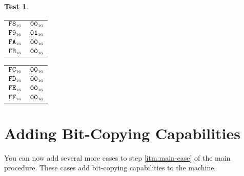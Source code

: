 \documentclass[a4paper,12pt]{article}
\makeatletter
\newcommand{\num}[1]{\texttt{#1}}
\newcommand{\hex}[1]{\num{#1}_{\textup{\tiny 16}}}
\newcommand{\MEM}[1]{\ifthenelse{\equal{#1}{}}{M}{M[#1]}}
\theoremstyle{definition}
\newtheorem{test}{Test}
\newenvironment{memtable}{%
  \begin{trivlist}
    \item
    }{%
    \end{trivlist}}
\newenvironment{memcolumn}{%
  \begin{tabular}{@{}ll@{}}
    \hline}
    {%
    \hline
  \end{tabular}}
\newcommand{\memspace}{\qquad}
\makeatother
\begin{document}
\begin{test}
\begin{memtable}
\begin{memcolumn}
      $\hex{F8}$ & $\hex{00}$ \\
      $\hex{F9}$ & $\hex{01}$ \\
      $\hex{FA}$ & $\hex{00}$ \\
      $\hex{FB}$ & $\hex{00}$ \\
    \end{memcolumn}
    \memspace
    \begin{memcolumn}
      $\hex{FC}$ & $\hex{00}$ \\
      $\hex{FD}$ & $\hex{00}$ \\
      $\hex{FE}$ & $\hex{00}$ \\
      $\hex{FF}$ & $\hex{00}$ \\
    \end{memcolumn}
  \end{memtable}
\end{test}

\section{Adding Bit-Copying Capabilities}

You can now add several more cases to step \ref{itm:main-case} of the main procedure.
These cases add bit-copying capabilities to the machine.
\end{document}
